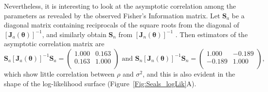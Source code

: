 \documentclass[12pt, titlepage]{article}
\begin{document}
Nevertheless, it is interesting to look at the asymptotic correlation among the parameters as revealed by the observed Fisher's Information matrix.  Let $\mathbf{S}_{a}$ be a diagonal matrix containing reciprocals of the square roots from the diagonal of $[\boldsymbol{J}_{a}{(\boldsymbol{\theta})}]^{-1}$, and similarly obtain $\mathbf{S}_{n}$ from $[\boldsymbol{J}_{n}{(\boldsymbol{\theta})}]^{-1}$ .  Then estimators of the asymptotic correlation matrix are
$$
\mathbf{S}_{a}[\boldsymbol{J}_{a}{(\boldsymbol{\theta})}]^{-1}\mathbf{S}_{a} =
\left(
\begin{array}{rr}
1.000 & 0.163 \\ 
  0.163 & 1.000  \\ 
\end{array}
\right) \textrm{ and }
\mathbf{S}_{n}[\boldsymbol{J}_{n}{(\boldsymbol{\theta})}]^{-1}\mathbf{S}_{n} =
\left(
\begin{array}{rr}
1.000 & -0.189 \\ 
  -0.189 & 1.000  \\ 
\end{array}
\right),
$$
which show little correlation between $\rho$ and $\sigma^{2}$, and this is also evident in the shape of the log-likelihood surface (Figure~\ref{Fig:Seals_logLik}A).
 
\end{document}
